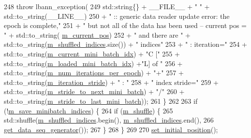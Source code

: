 \begin{DoxyCode}
248       \textcolor{keywordflow}{throw} lbann\_exception(
249         std::string\{\} + \_\_FILE\_\_ + \textcolor{stringliteral}{" "} + std::to\_string(\_\_LINE\_\_)
250         + \textcolor{stringliteral}{" :: generic data reader update error: the epoch is complete,"}
251         + \textcolor{stringliteral}{" but not all of the data has been used -- current pos = "} + std::to\_string(
      \hyperlink{classlbann_1_1generic__data__reader_a2facf4e410099ac8c1fa586e797ec2e0}{m\_current\_pos})
252         + \textcolor{stringliteral}{" and there are "} + std::to\_string(\hyperlink{classlbann_1_1generic__data__reader_aaab6aeff67ffff1c689336851fec2c57}{m\_shuffled\_indices}.size()) + \textcolor{stringliteral}{" indices"}
253         + \textcolor{stringliteral}{" : iteration="}
254         + std::to\_string(\hyperlink{classlbann_1_1generic__data__reader_aefd4bc0bf95de1e2500827581acf3536}{m\_current\_mini\_batch\_idx}) + \textcolor{stringliteral}{"C ["}
255         + std::to\_string(\hyperlink{classlbann_1_1generic__data__reader_a2cfc5a3e6de8a8a24d3525ec3ed586fb}{m\_loaded\_mini\_batch\_idx}) +\textcolor{stringliteral}{"L] of "}
256         + std::to\_string(\hyperlink{classlbann_1_1generic__data__reader_ab570063483a1f604ca2fc536c3d83de7}{m\_num\_iterations\_per\_epoch}) + \textcolor{stringliteral}{"+"}
257         + std::to\_string(\hyperlink{classlbann_1_1generic__data__reader_a73b23a2e7768db4e9e8ba4d9a362163a}{m\_iteration\_stride}) + \textcolor{stringliteral}{" : "}
258         + \textcolor{stringliteral}{" index stride="}
259         + std::to\_string(\hyperlink{classlbann_1_1generic__data__reader_a02c4632cc7cad5c3e4062934c41717a0}{m\_stride\_to\_next\_mini\_batch}) + \textcolor{stringliteral}{"/"}
260         + std::to\_string(\hyperlink{classlbann_1_1generic__data__reader_ac46922f2ef4f392bcc7c59c21685a3ff}{m\_stride\_to\_last\_mini\_batch}));
261     \}
262 
263     \textcolor{keywordflow}{if} (!\hyperlink{classlbann_1_1generic__data__reader_ab1d7cac44072bd1f67291c6169414112}{m\_save\_minibatch\_indices}) \{
264       \textcolor{keywordflow}{if} (\hyperlink{classlbann_1_1generic__data__reader_a8039ed9c12a5847f0dcf7dd54b8d2f5b}{m\_shuffle}) \{
265         std::shuffle(\hyperlink{classlbann_1_1generic__data__reader_aaab6aeff67ffff1c689336851fec2c57}{m\_shuffled\_indices}.begin(), 
      \hyperlink{classlbann_1_1generic__data__reader_aaab6aeff67ffff1c689336851fec2c57}{m\_shuffled\_indices}.end(),
266                      \hyperlink{namespacelbann_aba9d11cb3a739cd84e7234ceeb32d098}{get\_data\_seq\_generator}());
267       \}
268     \}
269 
270     \hyperlink{classlbann_1_1generic__data__reader_ac6d4a5ba1d4e1134620cddcac343bf59}{set\_initial\_position}();

\end{DoxyCode}
